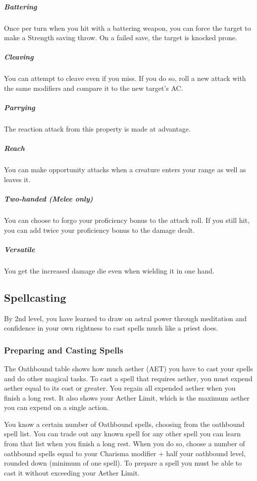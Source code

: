\subparagraph*{Battering} Once per turn when you hit with a battering weapon, you can force the target to make a Strength saving throw. On a failed save, the target is knocked prone.

\subparagraph*{Cleaving} You can attempt to cleave even if you miss. If you do so, roll a new attack with the same modifiers and compare it to the new target's AC.

\subparagraph*{Parrying} The reaction attack from this property is made at advantage.

\subparagraph*{Reach} You can make opportunity attacks when a creature enters your range as well as leaves it.

\subparagraph*{Two-handed (Melee only)} You can choose to forgo your proficiency bonus to the attack roll. If you still hit, you can add twice your proficiency bonus to the damage dealt.

\subparagraph*{Versatile} You get the increased damage die even when wielding it in one hand.

\subsection{Spellcasting}

By 2nd level, you have learned to draw on astral power through meditation and confidence in your own rightness to cast spells much like a priest does.

\subsubsection{Preparing and Casting Spells}

The Oathbound table shows how much aether (AET) you have to cast your spells and do other magical tasks. To cast a spell that requires aether, you must expend aether equal to its cost or greater. You regain all expended aether when you finish a long rest. It also shows your Aether Limit, which is the maximum aether you can expend on a single action.

You know a certain number of Oathbound spells, choosing from the oathbound spell list. You can trade out any known spell for any other spell you can learn from that list when you finish a long rest. When you do so, choose a number of oathbound spells equal to your Charisma modifier + half your oathbound level, rounded down (minimum of one spell). To prepare a spell you must be able to cast it without exceeding your Aether Limit.

